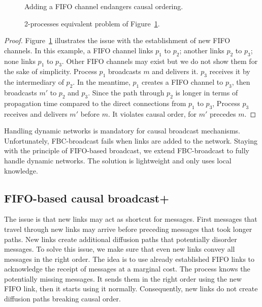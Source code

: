 \begin{figure}
  \begin{center}
    
    \caption{\label{fig:problem}Adding a FIFO channel endangers causal
      ordering.}
  \end{center}
\end{figure}

\begin{figure}
  \begin{center}
    
    \caption{\label{fig:eq2problem}2-processes equivalent problem of
      Figure~\ref{fig:problem}.}
  \end{center}
\end{figure}

\begin{proof}
  Figure~\ref{fig:problem} illustrates the issue with the establishment of new
  FIFO channels. In this example, a FIFO channel links $p_1$ to $p_2$; another
  links $p_2$ to $p_3$; none links $p_1$ to $p_3$. Other FIFO channels may exist
  but we do not show them for the sake of simplicity. Process $p_1$ broadcasts
  $m$ and delivers it. $p_3$ receives it by the intermediary of $p_2$. In the
  meantime, $p_1$ creates a FIFO channel to $p_3$, then broadcasts $m'$ to $p_2$
  and $p_3$. Since the path through $p_2$ is longer in terms of propagation time
  compared to the direct connections from $p_1$ to $p_3$, Process $p_3$ receives
  and delivers $m'$ before $m$. It violates causal order, for $m'$ precedes $m$.
\end{proof}

Handling dynamic networks is mandatory for causal broadcast
mechanisms. Unfortunately, FBC-broadcast fails when links are added to the
network. Staying with the principle of FIFO-based broadcast, we extend
FBC-broadcast to fully handle dynamic networks. The solution is lightweight and
only uses local knowledge.

\subsection{FIFO-based causal broadcast+}
\label{subsec:bufferbroadcast}

The issue is that new links may act as shortcut for messages. First messages
that travel through new links may arrive before preceding messages that took
longer paths. New links create additional diffusion paths that potentially
disorder messages. To solve this issue, we make sure that even new links convey
all messages in the right order. The idea is to use already established FIFO
links to acknowledge the receipt of messages at a marginal cost. The process
knows the potentially missing messages. It sends them in the right order using
the new FIFO link, then it starts using it normally. Consequently, new links
do not create diffusion paths breaking causal order.

